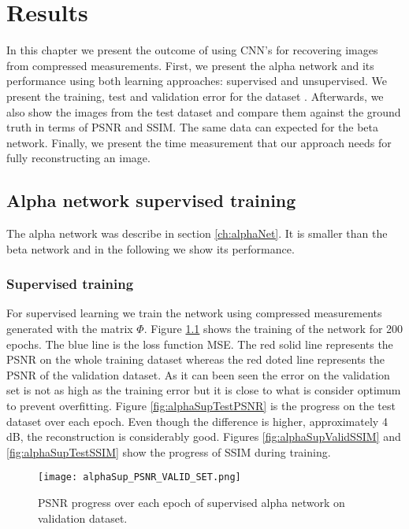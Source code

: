 \chapter{Results}
In this chapter we present the outcome of using CNN's for recovering images from compressed measurements. First, we present the alpha network and its performance using both learning approaches: supervised and unsupervised. We present the training, test and validation error for the dataset \cite{LFWTech}. Afterwards, we also show the images from the test dataset and compare them against the ground truth in terms of PSNR and SSIM. The same data can expected for the beta network. Finally, we present the time measurement that our approach needs for fully reconstructing an image.  

\section{Alpha network supervised training}
The alpha network was describe in section \ref{ch:alphaNet}. It is smaller than the beta network and in the following we show its performance.
\subsection{Supervised training}
For supervised learning we train the network using compressed measurements generated with the matrix $\Phi$. Figure \ref{fig:alphaSupValidPSNR} shows the training of the network for 200 epochs. The blue line is the loss function MSE. The red solid line represents the PSNR on the whole training dataset whereas the red doted line represents the PSNR of the validation dataset. As it can been seen the error on the validation set is not as high as the training error but it is close to what is consider optimum to prevent overfitting. Figure \ref{fig:alphaSupTestPSNR} is the progress on the test dataset over each epoch. Even though the difference is higher, approximately 4 dB, the reconstruction is considerably good. Figures \ref{fig:alphaSupValidSSIM} and \ref{fig:alphaSupTestSSIM} show the progress of SSIM during training. 
 
\begin{figure}[tb] 
\centering 
\texttt{[image: alphaSup\_PSNR\_VALID\_SET.png]}
\caption[PSNR validation progress during training of supervised alpha network]{PSNR progress over each epoch of supervised alpha network on validation dataset.}
\label{fig:alphaSupValidPSNR} 
\end{figure}  

